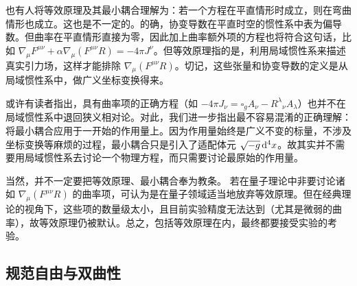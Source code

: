 也有人将等效原理及其最小耦合理解为：若一个方程在平直情形时成立，则在弯曲情形也成立。这也是不一定的。的确，协变导数在平直时空的惯性系中表为偏导数。但曲率在平直情形直接为零，因此加上曲率额外项的方程也将符合这句话，比如 $\nabla_\mu F^{\mu\nu}+\alpha \nabla_\mu(F^{\mu\nu}R)=-4 \pi J^\nu$。但等效原理指的是，利用局域惯性系来描述真实引力场，这样才能排除 $\nabla_\mu(F^{\mu\nu}R)$。切记，这些张量和协变导数的定义是从局域惯性系中，做广义坐标变换得来。

或许有读者指出，具有曲率项的正确方程（如 $-4\pi J_\nu=\square_g A_\nu- R^\lambda{}_{\nu} A_\lambda$）也并不在局域惯性系中退回狭义相对论。对此，我们进一步指出最不容易混淆的正确理解：将最小耦合应用于一开始的作用量上。因为作用量始终是广义不变的标量，不涉及坐标变换等麻烦的过程，最小耦合只是引入了适配体元 $\sqrt{-g}\dd[4]{x}$。故其实并不需要用局域惯性系去讨论一个物理方程，而只需要讨论最原始的作用量。

当然，并不一定要把等效原理、最小耦合奉为教条。
若在量子理论中非要讨论诸如 $\nabla_\mu(F^{\mu\nu}R)$ 的曲率项，可认为是在量子领域适当地放弃等效原理。但在经典理论的视角下，这些项的数量级太小，且目前实验精度无法达到（尤其是微弱的曲率），故等效原理仍被默认。总之，包括等效原理在内，最终都要接受实验的考验。


\subsection{规范自由与双曲性}

